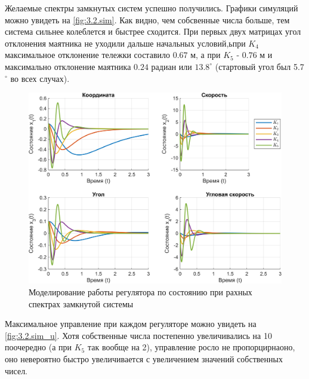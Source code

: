 Желаемые спектры замкнутых систем успешно получились.
Графики симуляций можно увидеть на \autoref{fig:3.2.sim}. 
Как видно, чем собсвенные числа больше,
тем система сильнее колеблется и быстрее сходится. При первых 
двух матрицах угол отклонения маятника не уходили дальше 
начальных условий,ьпри $K_4$ максимальное отклонение тележки составило 
$0.67$ м, а при $K_5$ - $0.76$ м
и максимально отклонение маятника $0.24$ радиан или $13.8^\circ$ 
(стартовый угол был 5.7$^\circ$
во всех случах).

\begin{figure}[H]
    \centering
    \includegraphics[width=\linewidth]{figs/3.2.sim.png}
    \caption{Моделирование работы регулятора по состоянию при
    рахных спектрах замкнутой системы}
    \label{fig:3.2.sim}
\end{figure}

\noindent Максимальное управление при каждом регуляторе можно увидеть на \autoref{fig:3.2.sim_u}.
Хотя собственные числа постепенно 
увеличивались на 10 поочередно (а при $K_5$ так вообще на 2), управление росло
не пропорцирнаоно, оно невероятно быстро увеличивается 
с увеличением значений собственных чисел.

